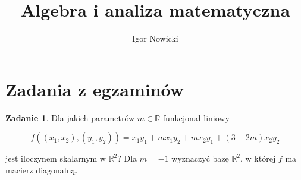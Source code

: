 \documentclass[11pt]{article}
\title{Algebra i analiza matematyczna}
\author{Igor Nowicki}
\theoremstyle{definition}
\newtheorem{zadanie}{Zadanie}
\begin{document}
\maketitle
\tableofcontents

\section{Zadania z egzaminów}

\begin{zadanie}
    Dla jakich parametrów $m\in\mathbb R$ funkcjonał liniowy

    $$f((x_1,x_2), (y_1,y_2)) = x_1y_1+mx_1y_2+mx_2y_1+(3-2m)x_2y_2$$

    jest iloczynem skalarnym w $\mathbb R^2$? Dla $m=-1$ wyznaczyć bazę $\mathbb R^2$, w której $f$ ma macierz diagonalną.
\end{zadanie}
\end{document}

